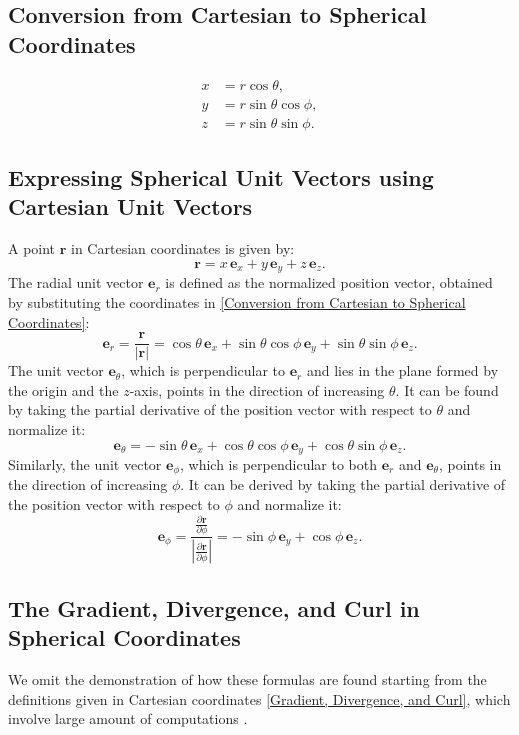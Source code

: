 \subsection{Conversion from Cartesian to Spherical Coordinates} 
\label{Conversion from Spherical to Cartesian Coordinates}
\begin{align}
    x &= r \cos \theta, \\
    y &= r \sin \theta \cos \phi, \\
    z &= r \sin \theta \sin \phi.   
\end{align}

\subsection{Expressing Spherical Unit Vectors using Cartesian Unit Vectors}
A point $\mathbf{r}$ in Cartesian coordinates is given by:
\[
\mathbf{r} = x \, \mathbf{e}_x + y \, \mathbf{e}_y + z \, \mathbf{e}_z.
\]
The radial unit vector \( \mathbf{e}_r \) is defined as the normalized position 
vector, obtained by substituting the coordinates in 
\ref{Conversion from Cartesian to Spherical Coordinates}:
\begin{equation}
\mathbf{e}_r = \frac{\mathbf{r}}{|\mathbf{r}|} = \cos\theta \, \mathbf{e}_x + 
\sin\theta \cos\phi \, \mathbf{e}_y + \sin\theta \sin\phi  \, \mathbf{e}_z.
\label{e_r}
\end{equation}
The unit vector \( \mathbf{e}_\theta \), which is perpendicular to \( 
\mathbf{e}_r \) and lies in the plane formed by the origin and the \( z \)-axis, 
points in the direction of increasing \( \theta \). It can be found by taking the 
partial derivative of the position vector with respect to \( \theta \) and 
normalize it:
\begin{equation}
\mathbf{e}_\theta = -\sin\theta \, \mathbf{e}_x + \cos\theta \cos\phi \, 
\mathbf{e}_y + \cos\theta \sin\phi \, \mathbf{e}_z.
\label{e_theta}
\end{equation}
Similarly, the unit vector \( \mathbf{e}_\phi \), which is perpendicular to both 
\( \mathbf{e}_r \) and \( \mathbf{e}_\theta \), points in the direction of 
increasing \( \phi \). It can be derived by taking the partial derivative of the 
position vector with respect to \( \phi \) and normalize it:
\[
\mathbf{e}_\phi = \frac{\frac{\partial \mathbf{r}}{\partial 
\phi}}{|\frac{\partial \mathbf{r}}{\partial \phi}|} = - \sin\phi  \, \mathbf{e}_y 
+ \cos\phi \, \mathbf{e}_z.
\]

\subsection{The Gradient, Divergence, and Curl in Spherical Coordinates}
We omit the demonstration of how these formulas are found starting from the 
definitions given in Cartesian coordinates \ref{Gradient, Divergence, and Curl}, 
which involve large amount of computations \cite{book-magnetism}.

